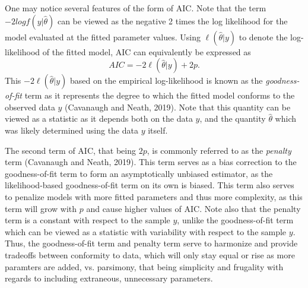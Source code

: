 		One may notice several features of the form of AIC. Note that the term $-2 log f(y|\hat{\theta})$ can be viewed as the negative 2 times the log likelihood for the model evaluated
		at the fitted parameter values. Using $\ell(\hat{\theta}|y)$ to denote the log-likelihood of the fitted model, AIC can equivalently be expressed as
		\begin{equation}
			AIC = -2 \ell(\hat{\theta}|y) + 2 p.
		\end{equation}
		This $-2 \ell(\hat{\theta}|y)$ based on the empirical log-likelihood is known as the \textit{goodness-of-fit} term as it represents the degree to which the fitted model
		conforms to the observed data $y$ (Cavanaugh and Neath, 2019). Note that this quantity can be viewed as a statistic as it depends both on the data $y$, and the quantity
		$\hat{\theta}$ which was likely determined using the data $y$ itself.

		The second term of AIC, that being $2 p$, is commonly referred to as the \textit{penalty} term (Cavanaugh and Neath, 2019). This term serves as a bias correction to the goodness-of-fit
		term to form an asymptotically unbiased estimator, as the likelihood-based goodness-of-fit term on its own is biased. This term also serves to penalize models with more fitted parameters and
		thus more complexity, as this term will grow with $p$ and cause higher values of AIC. Note also that the penalty term is a constant with respect to the sample $y$, unlike the goodness-of-fit
		term which can be viewed as a statistic with variability with respect to the sample $y$. Thus, the goodness-of-fit term and penalty term serve to harmonize and provide tradeoffs between
		conformity to data, which will only stay equal or rise as more paramters are added, vs. parsimony, that being simplicity and frugality with regards to including extraneous, unnecessary
		parameters.

